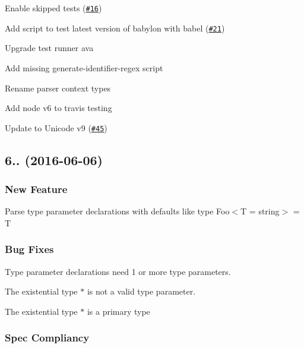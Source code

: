 \begin{DoxyItemize}
\item Enable skipped tests (\href{https://github.com/babel/babylon/pull/16}{\tt \#16}) 
\item Add script to test latest version of babylon with babel (\href{https://github.com/babel/babylon/pull/21}{\tt \#21}) 
\item Upgrade test runner ava 
\item Add missing generate-\/identifier-\/regex script 
\item Rename parser context types 
\item Add node v6 to travis testing 
\item Update to Unicode v9 (\href{https://github.com/babel/babylon/pull/45}{\tt \#45}) 
\end{DoxyItemize}

\subsection*{6.. (2016-\/06-\/06)}

\subsubsection*{New Feature}


\begin{DoxyItemize}
\item Parse type parameter declarations with defaults like {\ttfamily type Foo$<$T = string$>$ = T}
\end{DoxyItemize}

\subsubsection*{Bug Fixes}


\begin{DoxyItemize}
\item Type parameter declarations need 1 or more type parameters.
\item The existential type {\ttfamily $\ast$} is not a valid type parameter.
\item The existential type {\ttfamily $\ast$} is a primary type
\end{DoxyItemize}

\subsubsection*{Spec Compliancy}


